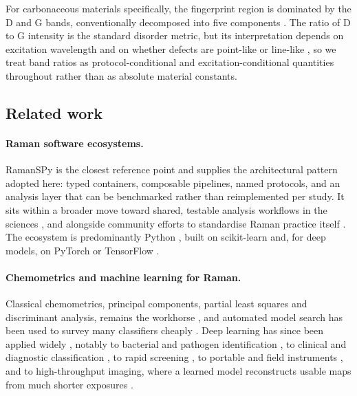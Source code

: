 For carbonaceous materials specifically, the fingerprint region is dominated by
the D and G bands, conventionally decomposed into five components
\cite{sadezky2005carbon}. The ratio of D to G intensity is the standard
disorder metric, but its interpretation depends on excitation wavelength and on
whether defects are point-like or line-like \cite{cancado2017disorder}, so we
treat band ratios as protocol-conditional and excitation-conditional quantities
throughout rather than as absolute material constants.


\subsection{Related work}
\label{sec:related}

\paragraph{Raman software ecosystems.}
RamanSPy \cite{georgiev2024ramanspy,georgiev2023ramanspy_preprint} is the
closest reference point and supplies the architectural pattern adopted here:
typed containers, composable pipelines, named protocols, and an analysis layer
that can be benchmarked rather than reimplemented per study. It sits within a
broader move toward shared, testable analysis workflows in the sciences
\cite{moller2017robust,alshdaifat2021implementation}, and alongside community
efforts to standardise Raman practice itself
\cite{ntziouni2022review,barton2022chemometrics}. The ecosystem is
predominantly Python \cite{vanrossum1995python}, built on scikit-learn
\cite{pedregosa2011scikit} and, for deep models, on PyTorch
\cite{paszke2019pytorch} or TensorFlow \cite{abadi2016tensorflow}.

\paragraph{Chemometrics and machine learning for Raman.}
Classical chemometrics, principal components, partial least squares and
discriminant analysis, remains the workhorse
\cite{guo2021chemometric,ryabchykov2018analyzing}, and automated model search
has been used to survey many classifiers cheaply \cite{pandala2021lazypredict}.
Deep learning has since been applied widely
\cite{luo2022deep,lussier2020deep,qi2023recent}, notably to bacterial and
pathogen identification \cite{ho2019rapid,lu2020combining,wang2021application},
to clinical and diagnostic classification
\cite{ralbovsky2020towards,yan2021rapid,zhang2022rapid,zhang2020rapid,sen2023differentiation},
to rapid screening \cite{yin2020raman,yin2021raman,zhu2021rapid}, to portable
and field instruments \cite{akpolat2020portable,han2020fast}, and to
high-throughput imaging, where a learned model reconstructs usable maps from
much shorter exposures \cite{horgan2021high}.

